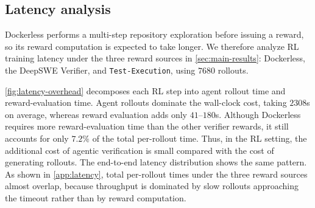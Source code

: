 \documentclass[]{arxiv_template}
\newcommand{\approach}{Dockerless\xspace}
\begin{document}

\subsection{Latency analysis}
\label{sec:latency-analysis}

\approach performs a multi-step repository exploration before issuing a reward, so its reward computation is expected to take longer.
We therefore analyze RL training latency under the three reward sources in \cref{sec:main-results}: \approach, the DeepSWE Verifier, and \texttt{Test-Execution}, using $7680$ rollouts.

\cref{fig:latency-overhead} decomposes each RL step into agent rollout time and reward-evaluation time.
Agent rollouts dominate the wall-clock cost, taking $2308$s on average, whereas reward evaluation adds only $41$--$180$s.
Although \approach requires more reward-evaluation time than the other verifier rewards, it still accounts for only $7.2\%$ of the total per-rollout time.
Thus, in the RL setting, the additional cost of agentic verification is small compared with the cost of generating rollouts.
The end-to-end latency distribution shows the same pattern.
As shown in \cref{app:latency}, total per-rollout times under the three reward sources almost overlap, because throughput is dominated by slow rollouts approaching the timeout rather than by reward computation.
\end{document}
